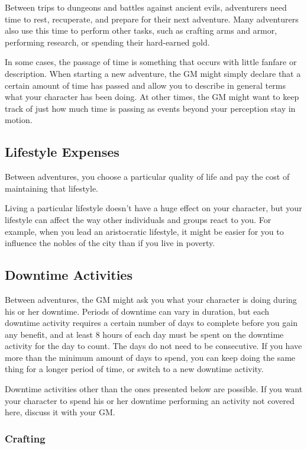 Between trips to dungeons and battles against ancient evils, adventurers need time to rest, recuperate, and prepare for their next adventure. Many adventurers also use this time to perform other tasks, such as crafting arms and armor, performing research, or spending their hard-earned gold.

In some cases, the passage of time is something that occurs with little fanfare or description. When starting a new adventure, the GM might simply declare that a certain amount of time has passed and allow you to describe in general terms what your character has been doing. At other times, the GM might want to keep track of just how much time is passing as events beyond your perception stay in motion.

\subsection{Lifestyle Expenses}

Between adventures, you choose a particular quality of life and pay the cost of maintaining that lifestyle.

Living a particular lifestyle doesn't have a huge effect on your character, but your lifestyle can affect the way other individuals and groups react to you. For example, when you lead an aristocratic lifestyle, it might be easier for you to influence the nobles of the city than if you live in poverty.

\subsection{Downtime Activities}

Between adventures, the GM might ask you what your character is doing during his or her downtime. Periods of downtime can vary in duration, but each downtime activity requires a certain number of days to complete before you gain any benefit, and at least 8 hours of each day must be spent on the downtime activity for the day to count. The days do not need to be consecutive. If you have more than the minimum amount of days to spend, you can keep doing the same thing for a longer period of time, or switch to a new downtime activity.

Downtime activities other than the ones presented below are possible. If you want your character to spend his or her downtime performing an activity not covered here, discuss it with your GM.

\subsubsection{Crafting}

